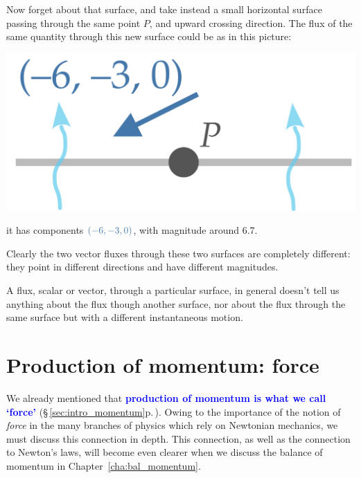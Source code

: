 \documentclass[a4paper,12pt,%
onecolumn,oneside,%
british%
]{memoir}
\providecommand{\href}[2]{#2}
\renewcommand*{\|}[1][]{\nonscript\:#1\vert\nonscript\:\mathopen{}}
\newcommand*{\sect}{\S}%
\newcommand*{\chap}{Chapter}%
\newcommand*{\furl}[2]{\href{#1}{#2}\pagenote{\url{#1}}}
\renewcommand*{\autoref}[3][\sect\,\ref]{\textcolor{blue}{#3} {\color{blue}\scriptsize(\faIcon[regular]{eye}\;#1{#2}\;p.\,\pageref{#2})}}
\begin{document}
Now forget about that surface, and take instead a small horizontal surface passing through the same point $P$, and upward crossing direction. The flux of the same quantity through this new surface could be as in this picture:
\begin{center}
  \includegraphics[align=c,scale=0.08]{images/skewfluxPy.pdf}
\end{center}
it has components $\mathcolor{blue}{(-6,-3,0)}$, with magnitude around \num{6.7}.

Clearly the two vector fluxes through these two surfaces are completely different: they point in different directions and have different magnitudes.

\begin{warning}
  A flux, scalar or vector, through a particular surface, in general doesn't tell us anything about the flux though another surface, nor about the flux through the same surface but with a different instantaneous motion.
\end{warning}


\section{Production of momentum: force}
\label{sec:force_is_production}

We already mentioned that \autoref{sec:intro_momentum}{\textbf{production of momentum is what we call \enquote*{force}}}. Owing to the importance of the notion of \emph{force} in the many branches of physics which rely on Newtonian mechanics, we must discuss this connection in depth. This connection, as well as the connection to Newton's laws, will become even clearer when we discuss the balance of momentum in \chap~\ref{cha:bal_momentum}.
\end{document}
